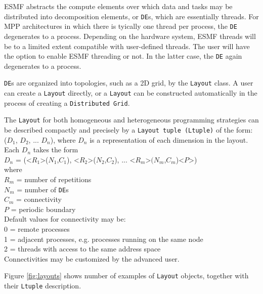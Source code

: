 ESMF abstracts the compute elements over which data and tasks may be
distributed into decomposition elements, or {\tt DE}s, which
are essentially threads.  For MPP architectures in which there
is tyically one thread per process, the {\tt DE} degenerates to a 
process.
Depending on the hardware system, ESMF threads will be to a limited 
extent compatible with user-defined threads.  The user will have 
the option to enable ESMF threading or not.  In the latter case, the
{\tt DE} again degenerates to a process.

{\tt DE}s are organized into topologies, such as a 2D grid, by the 
{\tt Layout} 
class.  A user can create a {\tt Layout} directly, or a {\tt Layout} can be 
constructed automatically in the process of creating a {\tt Distributed 
Grid}.  

The {\tt Layout} for both homogeneous and heterogeneous programming
strategies can be described compactly and precisely by a {\tt Layout 
tuple (Ltuple)} of the form: \\
($D_{1}$, $D_{2}$, ... $D_{n}$), where $D_{n}$ is a representation of
each dimension in the layout.  \\
Each $D_{n}$ takes the form \\
$D_{n}$ = (<$R_{1}$>($N_{1}$,$C_{1}$), <$R_{2}$>($N_{2}$,$C_{2}$), ... <$R_{m}$>$(N_{m}$,$C_{m}$)<$P$>) \\
where \\
$R_{m}$ = number of repetitions \\
$N_{m}$ = number of {\tt DE}s \\
$C_{m}$ = connectivity \\
$P$ = periodic boundary \\

Default values for connectivity may be: \\
0 = remote processes \\
1 = adjacent processes, e.g. processes running on the same node\\
2 = threads with access to the same address space \\
Connectivities may be customized by the advanced user.

Figure \ref{fig:layouts} shows number of examples of {\tt Layout} objects,
together with their {\tt Ltuple} description.

